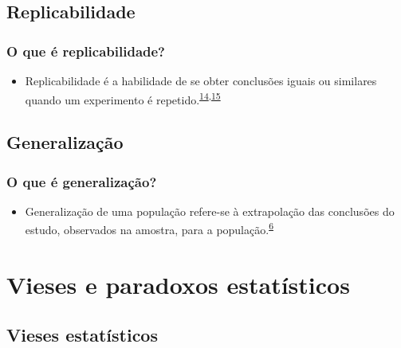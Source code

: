 \documentclass[
  a4paper,
]{book}
\providecommand{\tightlist}{%
  \setlength{\itemsep}{0pt}\setlength{\parskip}{0pt}}
\begin{document}
\hypertarget{replicabilidade}{%
\section{Replicabilidade}\label{replicabilidade}}

\hypertarget{o-que-uxe9-replicabilidade}{%
\subsection{O que é replicabilidade?}\label{o-que-uxe9-replicabilidade}}

\begin{itemize}
\tightlist
\item
  Replicabilidade é a habilidade de se obter conclusões iguais ou similares quando um experimento é repetido.\textsuperscript{\protect\hyperlink{ref-hofner2015}{14},\protect\hyperlink{ref-mair2016}{15}}
\end{itemize}

\hypertarget{generalizauxe7uxe3o}{%
\section{Generalização}\label{generalizauxe7uxe3o}}

\hypertarget{o-que-uxe9-generalizauxe7uxe3o}{%
\subsection{O que é generalização?}\label{o-que-uxe9-generalizauxe7uxe3o}}

\begin{itemize}
\tightlist
\item
  Generalização de uma população refere-se à extrapolação das conclusões do estudo, observados na amostra, para a população.\textsuperscript{\protect\hyperlink{ref-Banerjee2010}{6}}
\end{itemize}

\hypertarget{vieses-paradoxos-estatuxedsticos}{%
\chapter{\texorpdfstring{\textbf{Vieses e paradoxos estatísticos}}{Vieses e paradoxos estatísticos}}\label{vieses-paradoxos-estatuxedsticos}}

\hypertarget{vieses-estatisticos}{%
\section{Vieses estatísticos}\label{vieses-estatisticos}}
\end{document}
